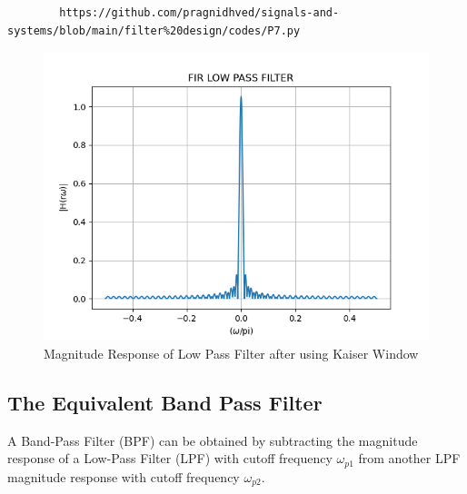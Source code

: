\documentclass{article}
\begin{document}
	\begin{lstlisting}
		https://github.com/pragnidhved/signals-and-systems/blob/main/filter%20design/codes/P7.py
	\end{lstlisting}
	\newpage
	\begin{figure}[htbp]
		\centering
		\includegraphics[width=1\linewidth]{figs/fig7}
		\caption{Magnitude Response of Low Pass Filter after using Kaiser Window}
		\label{fig:Kaiser_LPF_response}
	\end{figure}
	
	\subsection{The Equivalent Band Pass Filter}
	A Band-Pass Filter (BPF) can be obtained by subtracting the magnitude response of a Low-Pass Filter (LPF) with cutoff frequency $\omega_{p1}$ from another LPF magnitude response with cutoff frequency $\omega_{p2}$.
	
\end{document}
